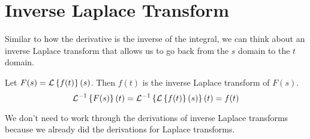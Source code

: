 \section{Inverse Laplace Transform}
\noindent
Similar to how the derivative is the inverse of the integral, we can think about an inverse Laplace transform that allows us to go back from the $s$ domain to the $t$ domain.
\begin{definition}
	Let $F(s) = \mathcal{L}\left\{ f(t) \right\}\left(s\right)$. Then $f(t)$ is the inverse Laplace transform of $F(s)$.
	\begin{equation*}
		\mathcal{L}^{-1}\left\{ F(s) \right\}\left(t\right) = \mathcal{L}^{-1}\left\{ \mathcal{L}\left\{ f(t) \right\}\left(s\right) \right\}\left(t\right) = f(t)
	\end{equation*}
\end{definition}

\noindent
We don't need to work through the derivations of inverse Laplace transforms because we already did the derivations for Laplace transforms.